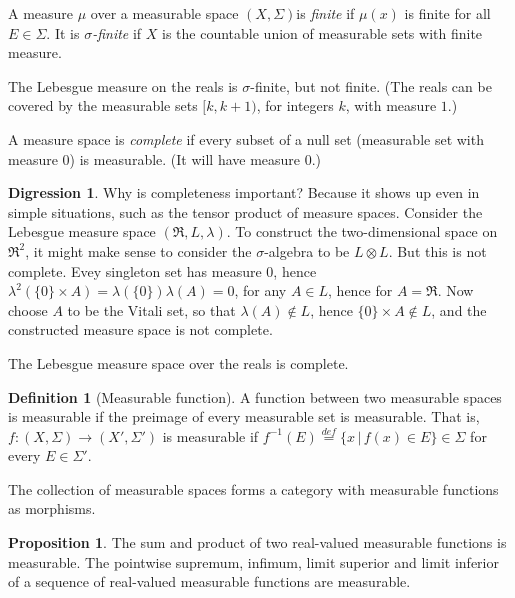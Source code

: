 \documentclass{article}
\newcommand{\alt}{\,|\,}
\newcommand{\defeq}{\stackrel{{\scriptscriptstyle def}}{=}}
\theoremstyle{definition}
\newtheorem{definition}{Definition}[section]
\newtheorem{proposition}[theorem]{Proposition}
\newtheorem{digression}[theorem]{Digression}
\begin{document}
A measure \(\mu\) over a measurable space \((X,\Sigma)\)is {\em finite} if \(\mu(x)\) is finite for all \(E\in \Sigma\). It is {\em \(\sigma\)-finite} if \(X\) is the countable union of measurable sets with finite measure.

The Lebesgue measure on the reals is \(\sigma\)-finite, but not finite. (The reals can be covered by the measurable sets \([k,k+1)\), for integers \(k\), with measure \(1\).)

  A measure space is {\em complete} if every subset of a null set (measurable set with measure \(0\)) is measurable. (It will have measure \(0\).)
  \begin{digression}
    Why is completeness important? Because it shows up even in simple situations, such as the tensor product of measure spaces. Consider the Lebesgue measure space \((\Re, L, \lambda)\). To construct the two-dimensional space on \(\Re^2\), it might make sense to consider the \(\sigma\)-algebra to be \(L\otimes L\). But this is not complete. Evey singleton set has measure \(0\), hence \(\lambda^2(\{0\}\times A)=\lambda(\{0\}) \lambda(A)=0\), for any \(A \in L\), hence for \(A=\Re\). Now choose \(A\) to be the Vitali set, so that \(\lambda(A)\not\in L\), hence \(\{0\}\times A \not\in L\), and the constructed measure space is not complete.
  \end{digression}

The Lebesgue measure space over the reals is complete.
  

\begin{definition}[Measurable function]
  A function between two measurable spaces is measurable if the preimage of every measurable set is measurable. That is, \(f:(X,\Sigma) \rightarrow (X',\Sigma')\) is measurable if \(f^{-1}(E)\defeq \{x\alt f(x)\in E\} \in \Sigma\) for every \(E\in\Sigma'\).
\end{definition}

The collection of measurable spaces forms a category with measurable functions as morphisms.

\begin{proposition}
The sum and product of two real-valued measurable functions is measurable. The pointwise supremum, infimum, limit superior and limit inferior of a sequence of real-valued measurable functions are measurable.
\end{proposition}
\end{document}
